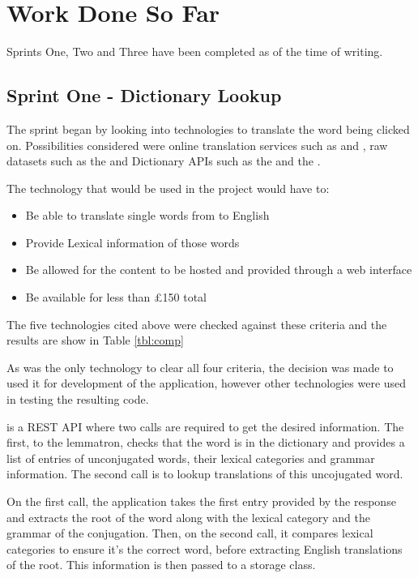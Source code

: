 \chapter{Work Done So Far}
Sprints One, Two and Three have been completed as of the time of writing.

\section{Sprint One - Dictionary Lookup}
The sprint began by looking into technologies to translate the word being clicked on. Possibilities considered were online translation services such as \textcite{googletranslate} and \textcite{bingtranslate}, raw datasets such as the \textcite{dictCC} and Dictionary APIs such as the \textcite{oxford} and the \textcite{collins}. 

The technology that would be used in the project would have to:
\begin{itemize}
	\item Be able to translate single words from to English
	\item Provide Lexical information of those words
	\item Be allowed for the content to be hosted and provided through a web interface
	\item Be available for less than \pounds150 total
\end{itemize}

The five technologies cited above were checked against these criteria and the results are show in Table \ref{tbl:comp}



As \textcite{oxford} was the only technology to clear all four criteria, the decision was made to used it for development of the application, however other technologies were used in testing the resulting code.

\textcite{oxford} is a REST API where two calls are required to get the desired information. The first, to the lemmatron, checks that the word is in the dictionary and provides a list of entries of unconjugated words, their lexical categories and grammar information. The second call is to lookup translations of this uncojugated word.

On the first call, the application takes the first entry provided by the response and extracts the root of the word along with the lexical category and the grammar of the conjugation. Then, on the second call, it compares lexical categories to ensure it's the correct word, before extracting English translations of the root. This information is then passed to a storage class.

